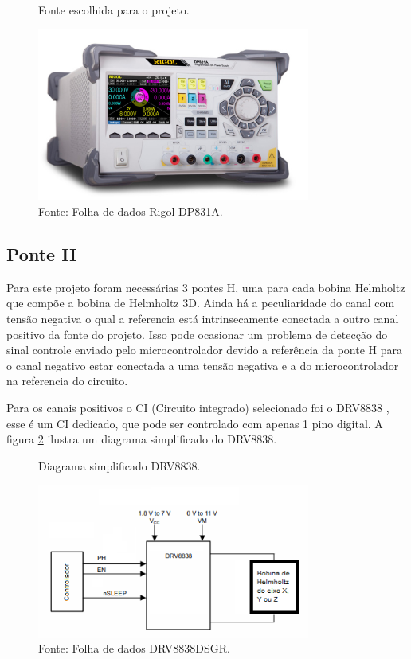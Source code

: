 \begin{figure}[H]
    \centering
     \caption{Fonte escolhida para o projeto.}
     \includegraphics[width=0.8\textwidth]{./img/bob/fonte.png}
     \caption*{Fonte: Folha de dados Rigol DP831A.}
     \label{fig:font}
\end{figure}

\subsection{Ponte H}

Para este projeto foram necessárias 3 pontes H, uma para cada bobina Helmholtz que compõe a bobina de Helmholtz 3D. Ainda há a peculiaridade do canal com tensão negativa o qual a referencia está intrinsecamente conectada a outro canal positivo da fonte do projeto. Isso pode ocasionar um problema de detecção do sinal controle enviado pelo microcontrolador devido a referência da ponte H para o canal negativo estar conectada a uma tensão negativa e a do microcontrolador na referencia do circuito.

Para os canais positivos o CI (Circuito integrado) selecionado foi o DRV8838 \cite{drv8838}, esse é um CI  dedicado, que pode ser controlado com apenas 1 pino digital. A figura \ref{fig:pontHCI} ilustra um diagrama simplificado do DRV8838.

\begin{figure}[H]
    \centering
     \caption{Diagrama simplificado DRV8838.}
     \includegraphics[width=0.8\textwidth]{./img/imagensExplicacoes/ponteHCI.png}
     \caption*{Fonte: Folha de dados DRV8838DSGR.\cite{drv8838}}
     \label{fig:pontHCI}
\end{figure}

